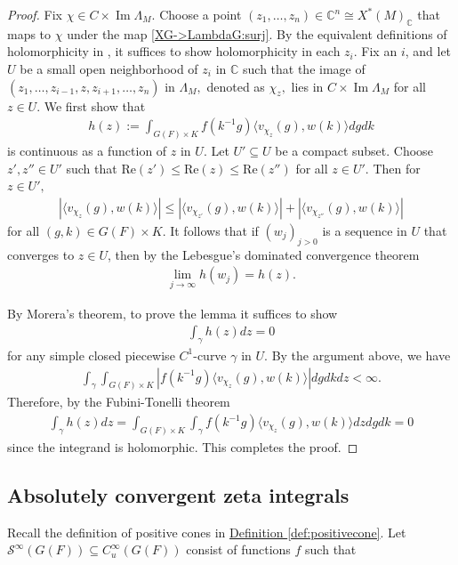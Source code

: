 \documentclass[10pt]{amsart}
\theoremstyle{definition}
\numberwithin{equation}{section}
\numberwithin{equation}{subsection}
\newcommand{\CC}{\mathbb{C}}
\renewcommand{\Im}{\mathop{\mathrm{Im}}}
\begin{document}
\begin{proof} 
Fix $\chi\in C\times \Im\Lambda_M.$ Choose a point $(z_1,\ldots,z_n)\in \CC^n\cong X^\ast(M)_\CC$ that maps to $\chi$ under the map \eqref{XG->LambdaG:surj}. By the equivalent definitions of holomorphicity in \cite[\S 0.2]{Complexanalysis}, it suffices to show holomorphicity in each $z_i$. Fix an $i$, and let $U$ be a small open neighborhood of $z_i$ in $\CC$ such that the image of $(z_1,\ldots,z_{i-1},z,z_{i+1},\ldots, z_n)$ in $\Lambda_M,$ denoted as $\chi_z,$ lies in $C\times\Im \Lambda_M$ for all $z\in U$. We first show that
\begin{align*}
    h(z):=\int_{G(F)\times K}f(k^{-1}g)\langle v_{\chi_z}(g),w(k)\rangle dgdk
\end{align*}
is continuous as a function of $z$ in $U$. Let $U'\subseteq U$ be a compact subset. Choose $z',z''\in U'$ such that $\mathrm{Re}(z')\le \mathrm{Re}(z)\le \mathrm{Re}(z'')$ for all $z\in U'.$ Then for $z\in U',$ 
\begin{align*}
     |\langle v_{\chi_z}(g),w(k)\rangle|\le |\langle v_{\chi_{z'}}(g),w(k)\rangle|+|\langle v_{\chi_{z''}}(g),w(k)\rangle| 
\end{align*}
for all $(g,k)\in G(F)\times K.$ It follows that if $(w_j)_{j>0}$ is a sequence in $U$ that converges to $z\in U$, then by the Lebesgue's dominated convergence theorem
\begin{align*}
    \lim_{j\to \infty} h(w_j)= h(z).
\end{align*}

 By Morera's theorem, to prove the lemma it suffices to show
\begin{align*}
    \int_{\gamma} h(z)dz=0
\end{align*}
for any simple closed piecewise $C^1$-curve $\gamma$ in $U$. By the argument above, we have
\begin{align*}
    \int_{\gamma}\int_{G(F)\times K} |f(k^{-1}g)\langle v_{\chi_z}(g),w(k)\rangle| dgdkdz<\infty.
\end{align*}
Therefore, by the Fubini-Tonelli theorem 
\begin{align*}
    \int_{\gamma}h(z)dz=\int_{G(F)\times K}\int_\gamma f(k^{-1}g)\langle v_{\chi_z}(g),w(k)\rangle dz dg dk=0
\end{align*}
since the integrand is holomorphic. This completes the proof.

\end{proof}


\subsection{Absolutely convergent zeta integrals}\label{subsec:L1zeta}
Recall the definition of positive cones in \hyperref[def:positivecone]{Definition \ref{def:positivecone}}. Let $\mathcal{S}^{\infty}(G(F))\subseteq C^\infty_{u}(G(F))$ consist of functions $f$ such that
\end{document}
